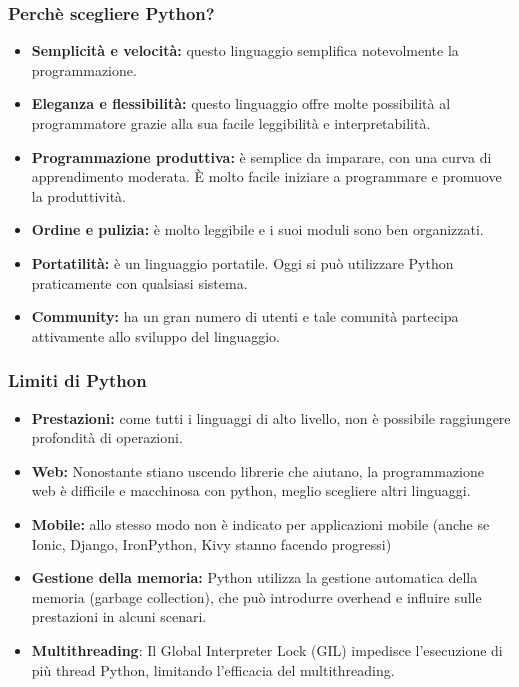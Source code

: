 \documentclass{beamer}
\begin{document}
{\begin{frame}
\end{frame}

\begin{frame}

   \frametitle{Perchè scegliere Python?}

    
    \begin{itemize}
        \item \textbf{Semplicità e velocità:} questo linguaggio semplifica notevolmente la programmazione.
        \item \textbf{Eleganza e flessibilità:} questo linguaggio offre molte possibilità al programmatore grazie alla sua facile leggibilità e interpretabilità.
        \item \textbf{Programmazione produttiva:} è semplice da imparare, con una curva di apprendimento moderata. È molto facile iniziare a programmare e promuove la produttività.
        \item \textbf{Ordine e pulizia:} è molto leggibile e i suoi moduli sono ben organizzati.
        \item \textbf{Portatilità:} è un linguaggio portatile. Oggi si può utilizzare Python praticamente con qualsiasi sistema.
        \item \textbf{Community:} ha un gran numero di utenti e tale comunità partecipa attivamente allo sviluppo del linguaggio.
    \end{itemize}

\end{frame}

\begin{frame}

   \frametitle{Limiti di Python}

    \begin{itemize}
        \item \textbf{Prestazioni:} come tutti i linguaggi di alto livello, non è possibile raggiungere profondità di operazioni.
        \item \textbf{Web:} Nonostante stiano uscendo librerie che aiutano, la programmazione web è difficile e macchinosa con python, meglio scegliere altri linguaggi.
        \item \textbf{Mobile:} allo stesso modo non è indicato per applicazioni mobile (anche se Ionic, Django, IronPython, Kivy stanno facendo progressi)
        \item \textbf{Gestione della memoria:} Python utilizza la gestione automatica della memoria (garbage collection), che può introdurre overhead e influire sulle prestazioni in alcuni scenari.
        \item \textbf{Multithreading}: Il Global Interpreter Lock (GIL) impedisce l'esecuzione di più thread Python, limitando l'efficacia del multithreading.
    \end{itemize}


\end{frame}}
\end{document}
